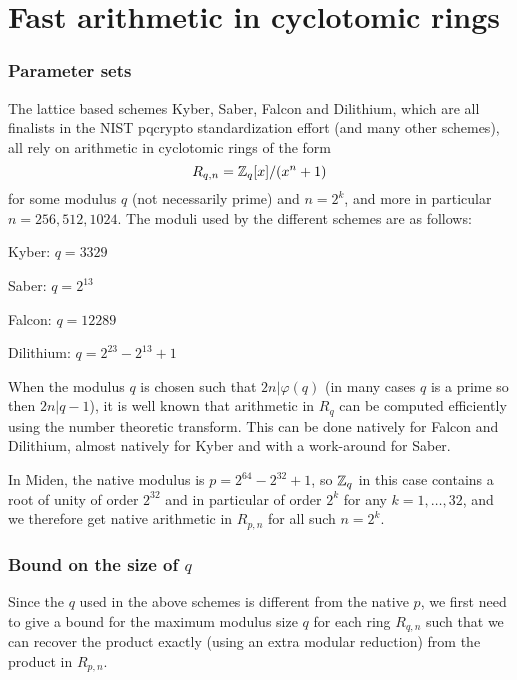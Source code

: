 \section{Fast arithmetic in cyclotomic rings}

\subsubsection{Parameter sets}

The lattice based schemes Kyber, Saber, Falcon and Dilithium, which are all finalists in the NIST pqcrypto standardization
effort (and many other schemes), all rely on arithmetic in cyclotomic rings of the form
\[  R_{q,n} = \mathbb{Z}_q[x]/(x^n + 1)    \]
for some modulus $q$ (not necessarily prime) and $n = 2^k$, and more in particular $n = 256, 512, 1024$.
The moduli used by the different schemes are as follows:
\bit
\item Kyber: $q = 3329$
\item Saber: $q = 2^{13}$
\item Falcon: $q = 12289$
\item Dilithium: $q = 2^{23} - 2^{13} + 1$
\eit

When the modulus $q$ is chosen such that $2n | \varphi(q)$ (in many cases $q$ is a prime so then $2n | q-1$), 
it is well known that arithmetic in $R_q$ can be computed efficiently using the number theoretic transform.
This can be done natively for Falcon and Dilithium, almost natively for Kyber and with a work-around for Saber.

In Miden, the native modulus is $p = 2^{64} - 2^{32} + 1$, so $\mathbb{Z}_q$ in this case contains a root of unity 
of order $2^{32}$ and in particular of order $2^k$ for any $k = 1, \ldots, 32$, and we therefore get native
arithmetic in $R_{p,n}$ for all such $n = 2^k$.

\subsubsection{Bound on the size of $q$}

Since the $q$ used in the above schemes is different from the native $p$, we first need to give a bound for
the maximum modulus size $q$ for each ring $R_{q,n}$ such that we can recover the product exactly (using 
an extra modular reduction) from the product in $R_{p,n}$.

